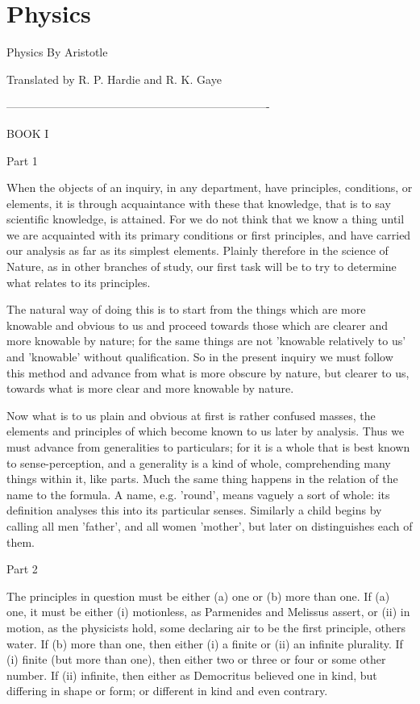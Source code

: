 \chapter{Physics} %
\label{cha:physics}

Physics
By Aristotle


Translated by R. P. Hardie and R. K. Gaye

----------------------------------------------------------------------

BOOK I

Part 1 

When the objects of an inquiry, in any department, have principles,
conditions, or elements, it is through acquaintance with these that
knowledge, that is to say scientific knowledge, is attained. For we
do not think that we know a thing until we are acquainted with its
primary conditions or first principles, and have carried our analysis
as far as its simplest elements. Plainly therefore in the science
of Nature, as in other branches of study, our first task will be to
try to determine what relates to its principles. 

The natural way of doing this is to start from the things which are
more knowable and obvious to us and proceed towards those which are
clearer and more knowable by nature; for the same things are not 'knowable
relatively to us' and 'knowable' without qualification. So in the
present inquiry we must follow this method and advance from what is
more obscure by nature, but clearer to us, towards what is more clear
and more knowable by nature. 

Now what is to us plain and obvious at first is rather confused masses,
the elements and principles of which become known to us later by analysis.
Thus we must advance from generalities to particulars; for it is a
whole that is best known to sense-perception, and a generality is
a kind of whole, comprehending many things within it, like parts.
Much the same thing happens in the relation of the name to the formula.
A name, e.g. 'round', means vaguely a sort of whole: its definition
analyses this into its particular senses. Similarly a child begins
by calling all men 'father', and all women 'mother', but later on
distinguishes each of them. 

Part 2

The principles in question must be either (a) one or (b) more than
one. If (a) one, it must be either (i) motionless, as Parmenides and
Melissus assert, or (ii) in motion, as the physicists hold, some declaring
air to be the first principle, others water. If (b) more than one,
then either (i) a finite or (ii) an infinite plurality. If (i) finite
(but more than one), then either two or three or four or some other
number. If (ii) infinite, then either as Democritus believed one in
kind, but differing in shape or form; or different in kind and even
contrary. 

